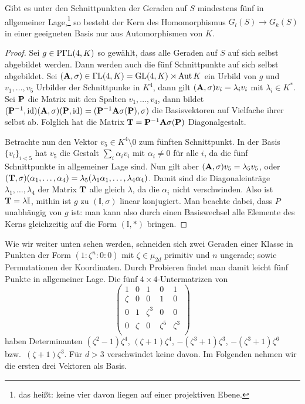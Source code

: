 \begin{lemma}
Gibt es unter den Schnittpunkten der Geraden auf $S$ mindestens fünf in allgemeiner Lage,\footnote{das heißt: keine vier davon liegen auf einer projektiven Ebene.} so besteht der Kern des Homomorphismus $G_l(S) \to G_k(S)$ in einer geeigneten Basis nur aus Automorphismen von $K$.
\end{lemma}
\begin{proof}
Sei $g \in \mathrm{P\Gamma L}(4,K)$ so gewählt, dass alle Geraden auf $S$ auf sich selbst abgebildet werden. Dann werden auch die fünf Schnittpunkte auf sich selbst abgebildet. Sei $(\mathbf{A}, \sigma) \in \mathrm{\Gamma L}(4,K) = \mathrm{GL}(4,K) \rtimes \operatorname{Aut} K$ ein Urbild von $g$ und $v_1, \dots, v_5$ Urbilder der Schnittpunke in $K^4$, dann gilt $(\mathbf{A}, \sigma)v_i = \lambda_i v_i$ mit $\lambda_i \in K^*$. Sei $\mathbf{P}$ die Matrix mit den Spalten $v_1, \dots, v_4$, dann bildet $(\mathbf{P}^{-1},\operatorname{id})(\mathbf{A},\sigma)(\mathbf{P},\operatorname{id}) = (\mathbf{P}^{-1}\mathbf{A}\sigma(\mathbf{P}),\sigma)$ die Basisvektoren auf Vielfache ihrer selbst ab. Folglich hat die Matrix $\mathbf{T} = \mathbf{P}^{-1}\mathbf{A}\sigma(\mathbf{P})$ Diagonalgestalt.

Betrachte nun den Vektor $v_5 \in K^4 \setminus 0$ zum fünften Schnittpunkt. In der Basis $\{v_i\}_{i<5}$ hat $v_5$ die Gestalt $\sum_i \alpha_i v_i$ mit $\alpha_i \neq 0$ für alle $i$, da die fünf Schnittpunkte in allgemeiner Lage sind. Nun gilt aber $(\mathbf{A},\sigma) v_5 = \lambda_5 v_5$, oder $(\mathbf{T},\sigma)(\alpha_1,\dots,\alpha_4) = \lambda_5(\lambda_1\alpha_1,\dots,\lambda_4\alpha_4)$. Damit sind die Diagonaleinträge $\lambda_1, \dots, \lambda_4$ der Matrix $\mathbf{T}$ alle gleich $\lambda$, da die $\alpha_i$ nicht verschwinden. Also ist $\mathbf{T} = \lambda \mathbb I$, mithin ist $g$ zu $(\mathbb I, \sigma)$ linear konjugiert. Man beachte dabei, dass $P$ unabhängig von $g$ ist: man kann also durch einen Basiswechsel alle Elemente des Kerns gleichzeitig auf die Form $(\mathbb I, *)$ bringen.
\end{proof}
Wie wir weiter unten sehen werden, schneiden sich zwei Geraden einer Klasse in Punkten der Form $(1:\zeta^n:0:0)$ mit $\zeta \in \mu_{2d}$ primitiv und $n$ ungerade; sowie Permutationen der Koordinaten. Durch Probieren findet man damit leicht fünf Punkte in allgemeiner Lage. Die fünf $4 \times 4$-Untermatrizen von
\begin{equation*}
\begin{pmatrix}
1 & 0 & 1 & 0 & 1 \\
\zeta & 0 & 0 & 1 & 0 \\
0 & 1 & \zeta^3 & 0 & 0 \\
0 & \zeta & 0 & \zeta^5 & \zeta^3 \\
\end{pmatrix}
\end{equation*}
haben Determinanten $(\zeta^2-1)\zeta^4$, $(\zeta+1)\zeta^4$, $-(\zeta^3+1)\zeta^3$, $-(\zeta^3+1)\zeta^6$ bzw.~$(\zeta+1)\zeta^3$. Für $d>3$ verschwindet keine davon. Im Folgenden nehmen wir die ersten drei Vektoren als Basis.


